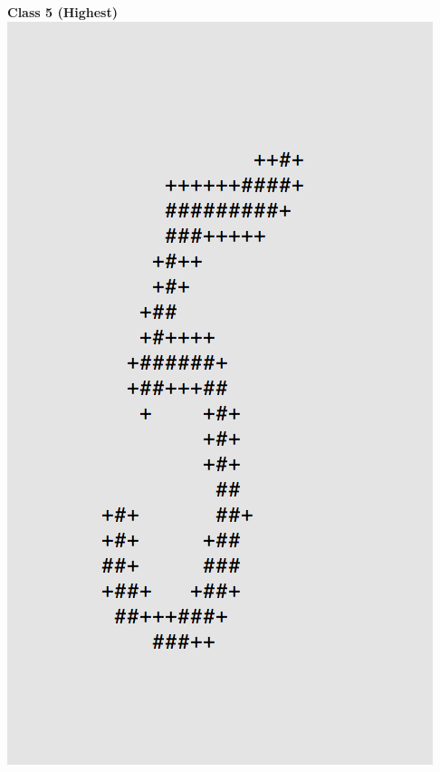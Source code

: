 \documentclass[11pt]{article}
\begin{document}
\begin{center}
\begin{multicols}{2}
\textbf{Class 5 (Highest)}\\
\includegraphics[scale=0.4]{part1/1/high_5.png}


\end{multicols}
\end{center}
\end{document}
